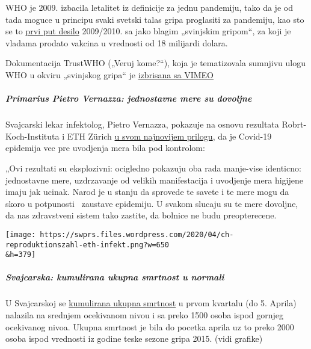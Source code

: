 WHO je 2009. izbacila letalitet iz definicije za jednu pandemiju, tako
da je od tada moguce u principu svaki svetski talas gripa proglasiti za
pandemiju, kao sto se to
\href{https://www.forbes.com/consent/?toURL=https://www.forbes.com/2010/02/05/world-health-organization-swine-flu-pandemic-opinions-contributors-michael-fumento.html}{prvi
put desilo} 2009/2010. sa jako blagim „svinjskim gripom``, za koji je
vladama prodato vakcina u vrednosti od 18 milijardi dolara.

Dokumentacija TrustWHO („Veruj kome?``), koja je tematizovala sumnjivu
ulogu WHO u okviru „svinjskog gripa`` je
\href{https://www.youtube.com/watch?v=VjQGyqVN5RM}{izbrisana sa VIMEO}

\hypertarget{primarius-pietro-vernazza-jednostavne-mere-su-dovoljne}{%
\subparagraph{\texorpdfstring{\textbf{Primarius Pietro Vernazza:
jednostavne mere su
dovoljne}}{Primarius Pietro Vernazza: jednostavne mere su dovoljne}}\label{primarius-pietro-vernazza-jednostavne-mere-su-dovoljne}}

Svajcarski lekar infektolog, Pietro Vernazza, pokazuje na osnovu
rezultata Robrt-Koch-Instituta i ETH Zürich
\href{https://infekt.ch/2020/04/sind-wir-tatsaechlich-im-blindflug/}{u
svom najnovijem prilogu}, da je Covid-19 epidemija vec pre uvodjenja
mera bila pod kontrolom:

„Ovi rezultati su eksplozivni: ocigledno pokazuju oba rada manje-vise
identicno: jednostavne mere, uzdrzavanje od velikih manifestacija i
uvodjenje mera higijene imaju jak ucinak. Narod je u stanju da sprovede
te savete i te mere mogu da skoro u potpunosti ~zaustave epidemiju. U
svakom slucaju su te mere dovoljne, da nas zdravstveni sistem tako
zastite, da bolnice ne budu preopterecene.

\texttt{[image: https://swprs.files.wordpress.com/2020/04/ch-reproduktionszahl-eth-infekt.png?w=650\\\&h=379]}

\hypertarget{svajcarska-kumulirana-ukupna-smrtnost-u-normali}{%
\subparagraph{\texorpdfstring{\textbf{Svajcarska: kumulirana ukupna
smrtnost u
normali}}{Svajcarska: kumulirana ukupna smrtnost u normali}}\label{svajcarska-kumulirana-ukupna-smrtnost-u-normali}}

U Svajcarskoj se
\href{https://swprs.files.wordpress.com/2020/04/ch-sterblichkeit-kumuliert-q1-2020.pdf}{kumulirana
ukupna smrtnost} u prvom kvartalu (do 5. Aprila) nalazila na srednjem
ocekivanom nivou i sa preko 1500 osoba ispod gornjeg ocekivanog nivoa.
Ukupna smrtnost je bila do pocetka aprila uz to preko 2000 osoba ispod
vrednosti iz godine teske sezone gripa 2015. (vidi grafike)

